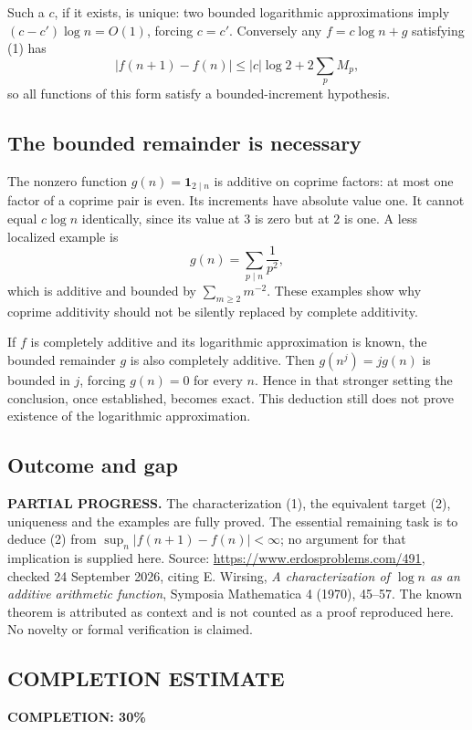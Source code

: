 Such a $c$, if it exists, is unique: two bounded logarithmic approximations imply $(c-c')\log n=O(1)$, forcing $c=c'$. Conversely any $f=c\log n+g$ satisfying (1) has
\[|f(n+1)-f(n)|\le |c|\log2+2\sum_p M_p,
\]
so all functions of this form satisfy a bounded-increment hypothesis.

\subsection*{The bounded remainder is necessary}
The nonzero function $g(n)=\mathbf1_{2\mid n}$ is additive on coprime factors: at most one factor of a coprime pair is even. Its increments have absolute value one. It cannot equal $c\log n$ identically, since its value at $3$ is zero but at $2$ is one. A less localized example is
\[g(n)=\sum_{p\mid n}\frac1{p^2},
\]
which is additive and bounded by $\sum_{m\ge2}m^{-2}$. These examples show why coprime additivity should not be silently replaced by complete additivity.

If $f$ is completely additive and its logarithmic approximation is known, the bounded remainder $g$ is also completely additive. Then $g(n^j)=jg(n)$ is bounded in $j$, forcing $g(n)=0$ for every $n$. Hence in that stronger setting the conclusion, once established, becomes exact. This deduction still does not prove existence of the logarithmic approximation.

\subsection*{Outcome and gap}
\textbf{PARTIAL PROGRESS.} The characterization (1), the equivalent target (2), uniqueness and the examples are fully proved. The essential remaining task is to deduce (2) from $\sup_n|f(n+1)-f(n)|<\infty$; no argument for that implication is supplied here.
Source: \url{https://www.erdosproblems.com/491}, checked 24 September 2026, citing E. Wirsing, \emph{A characterization of $\log n$ as an additive arithmetic function}, Symposia Mathematica 4 (1970), 45--57. The known theorem is attributed as context and is not counted as a proof reproduced here. No novelty or formal verification is claimed.

\subsection*{COMPLETION ESTIMATE}
\textbf{COMPLETION: 30\%}
